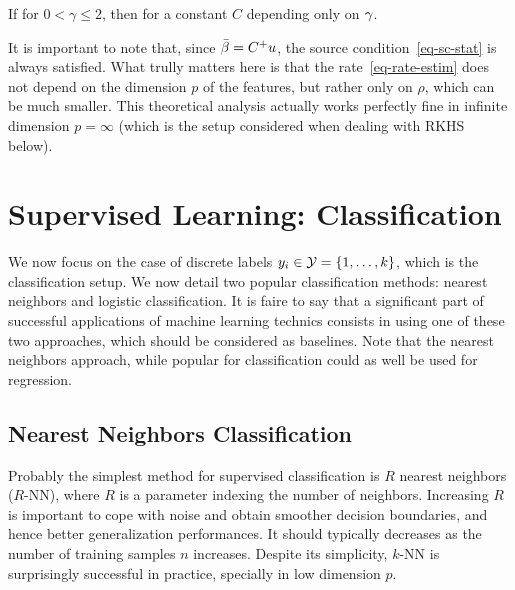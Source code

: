 \begin{thm}
	If
	for $0 < \gamma \leq 2$, then 
	for a constant $C$ depending only on $\gamma$.
\end{thm}

It is important to note that, since $\bar{\beta} = C^{+} u$, the source condition~\eqref{eq-sc-stat} is always satisfied. What trully matters here is that the rate~\eqref{eq-rate-estim} does not depend on the dimension $p$ of the features, but rather only on $\rho$, which can be much smaller. This theoretical analysis actually works perfectly fine in infinite dimension $p=\infty$ (which is the setup considered when dealing with RKHS below). 


\section{Supervised Learning: Classification}
\label{sec-classif}

We now focus on the case of discrete labels $y_i \in \mathcal{Y} = \{1,\ldots,k\}$, which is the classification setup.
%
We now detail two popular classification methods: nearest neighbors and logistic classification.
%
It is faire to say that a significant part of successful applications of machine learning technics consists in using one of these two approaches, which should be considered as baselines. 
%
Note that the nearest neighbors approach, while popular for classification could as well be used for regression.

\subsection{Nearest Neighbors Classification}
\label{sec-nn-classif}

Probably the simplest method for supervised classification is $R$ nearest neighbors ($R$-NN), where $R$ is a parameter indexing the number of neighbors. Increasing $R$ is important to cope with noise and obtain smoother decision boundaries, and hence better generalization performances. It should typically decreases as the number of training samples $n$ increases.
%
Despite its simplicity, $k$-NN is surprisingly successful in practice, specially in low dimension $p$.

